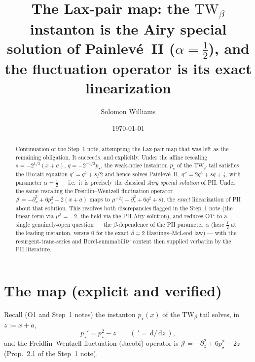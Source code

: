 \documentclass[11pt,reqno]{amsart}
\theoremstyle{plain}
\theoremstyle{remark}
\newcommand{\dd}{\,\mathrm{d}}
\newcommand{\pinst}{p_\star}
\begin{document}
\title[Step~1 completed: the instanton is the Airy solution of Painlev\'e~II]{The Lax-pair map:
the $\mathrm{TW}_\beta$ instanton is the Airy special solution of Painlev\'e~II ($\alpha=\tfrac12$),
and the fluctuation operator is its exact linearization}
\author{Solomon Williams}
\date{\today}

\begin{abstract}
Continuation of the Step~1 note, attempting the Lax-pair map that was left as the remaining
obligation. It succeeds, and explicitly. Under the affine rescaling $s=-2^{1/3}(x+a)$,
$q=-2^{-1/3}\pinst$, the weak-noise instanton $\pinst$ of the $\mathrm{TW}_\beta$ tail satisfies the
Riccati equation $q'=q^2+s/2$ and hence solves Painlev\'e~II, $q''=2q^3+sq+\tfrac12$, with parameter
$\alpha=\tfrac12$ --- i.e.\ it is precisely the classical \emph{Airy special solution} of PII. Under
the same rescaling the Freidlin--Wentzell fluctuation operator
$\mathcal J=-\partial_x^2+6\pinst^2-2(x+a)$ maps to $\mu^{-2}\bigl(-\partial_s^2+6q^2+s\bigr)$, the
\emph{exact} linearization of PII about that solution. This resolves both discrepancies flagged in
the Step~1 note (the linear term via $\mu^3=-2$, the field via the PII Airy-solution), and reduces
O1$^\star$ to a single genuinely-open question --- the $\beta$-dependence of the PII parameter
$\alpha$ (here $\tfrac12$ at the leading instanton, versus $0$ for the exact $\beta=2$
Hastings--McLeod law) --- with the resurgent-trans-series and Borel-summability content then
supplied verbatim by the PII literature.
\end{abstract}

\maketitle

\section{The map (explicit and verified)}

Recall (O1 and Step~1 notes) the instanton $\pinst(x)$ of the $\mathrm{TW}_\beta$ tail solves, in
$z:=x+a$,
\begin{equation}\label{eq:inst}
\pinst'=\pinst^2-z\qquad(\ '=\dd/\dd z\ ),
\end{equation}
and the Freidlin--Wentzell fluctuation (Jacobi) operator is
$\mathcal J=-\partial_z^2+6\pinst^2-2z$ (Prop.~2.1 of the Step~1 note).
\end{document}
